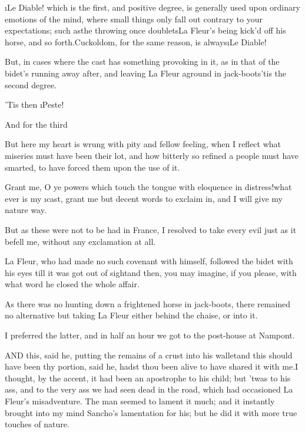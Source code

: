 \documentclass[twoside]{article}
\begin{document}
\i{Le Diable}! which is the first, and positive degree, is generally used
upon ordinary emotions of the mind, where small things only fall out
contrary to your expectations; such as\tsk the throwing once doublets\tsk La
Fleur’s being kick’d off his horse, and so forth.\tsk Cuckoldom, for the same
reason, is always\tsk \i{Le Diable}!

But, in cases where the cast has something provoking in it, as in that of
the bidet’s running away after, and leaving La Fleur aground in
jack-boots\tsk ’tis the second degree.

’Tis then \i{Peste}!

And for the third\tsk 

\tsk But here my heart is wrung with pity and fellow feeling, when I reflect
what miseries must have been their lot, and how bitterly so refined a
people must have smarted, to have forced them upon the use of it.\tsk 

Grant me, O ye powers which touch the tongue with eloquence in
distress!\tsk what ever is my \i{cast}, grant me but decent words to exclaim
in, and I will give my nature way.

\tsk But as these were not to be had in France, I resolved to take every evil
just as it befell me, without any exclamation at all.

La Fleur, who had made no such covenant with himself, followed the bidet
with his eyes till it was got out of sight\tsk and then, you may imagine, if
you please, with what word he closed the whole affair.

As there was no hunting down a frightened horse in jack-boots, there
remained no alternative but taking La Fleur either behind the chaise, or
into it.\tsk 

I preferred the latter, and in half an hour we got to the post-house at
Nampont.






\tsk AND this, said he, putting the remains of a crust into his wallet\tsk and
this should have been thy portion, said he, hadst thou been alive to have
shared it with me.\tsk I thought, by the accent, it had been an apostrophe to
his child; but ’twas to his ass, and to the very ass we had seen dead in
the road, which had occasioned La Fleur’s misadventure.  The man seemed
to lament it much; and it instantly brought into my mind Sancho’s
lamentation for his; but he did it with more true touches of nature.
\end{document}
